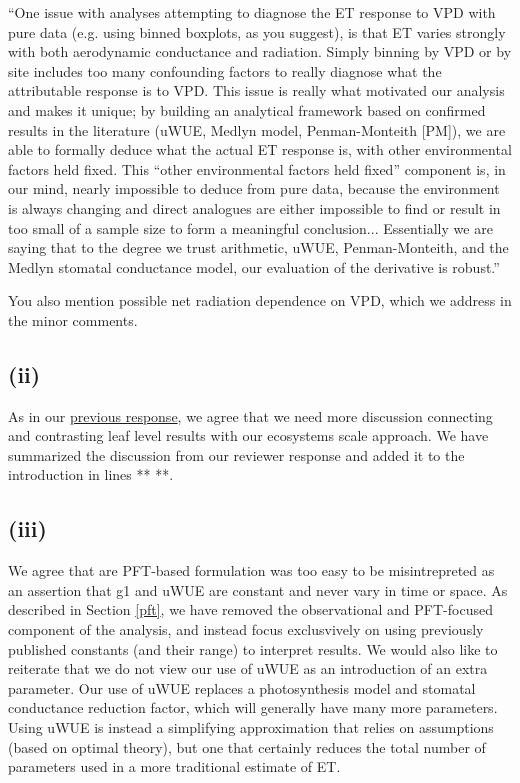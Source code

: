 \documentclass[12pt]{article}
\begin{document}
``One issue with analyses attempting to diagnose the ET response to
VPD with pure data (e.g. using binned boxplots, as you suggest), is
that ET varies strongly with both aerodynamic conductance and
radiation. Simply binning by VPD or by site includes too many
confounding factors to really diagnose what the attributable response
is to VPD. This issue is really what motivated our analysis and makes
it unique; by building an analytical framework based on confirmed
results in the literature (uWUE, Medlyn model, Penman-Monteith [PM]),
we are able to formally deduce what the actual ET response is, with
other environmental factors held fixed. This ``other environmental
factors held fixed'' component is, in our mind, nearly impossible to
deduce from pure data, because the environment is always changing and
direct analogues are either impossible to find or result in too small
of a sample size to form a meaningful conclusion... Essentially we are
saying that to the degree we trust arithmetic, uWUE, Penman-Monteith,
and the Medlyn stomatal conductance model, our evaluation of the
derivative is robust.''

You also mention possible net radiation dependence on VPD, which we
address in the minor comments.

\subsection{(ii)}
\label{leaf}
As in our
\href{https://www.hydrol-earth-syst-sci-discuss.net/hess-2018-553/hess-2018-553-AC2-supplement.pdf}{previous
  response}, we agree that we need more discussion connecting and
contrasting leaf level results with our ecosystems scale approach. We
have summarized the discussion from our reviewer response and added it
to the introduction in lines ** **.

\subsection{(iii)}

We agree that are PFT-based formulation was too easy to be
misintrepreted as an assertion that g1 and uWUE are constant and never
vary in time or space. As described in Section \ref{pft}, we have
removed the observational and PFT-focused component of the analysis,
and instead focus exclusvively on using previously published constants
(and their range) to interpret results. We would also like to
reiterate that we do not view our use of uWUE as an introduction of an
extra parameter. Our use of uWUE replaces a photosynthesis model and
stomatal conductance reduction factor, which will generally have many
more parameters. Using uWUE is instead a simplifying approximation
that relies on assumptions (based on optimal theory), but one that
certainly reduces the total number of parameters used in a more
traditional estimate of ET.
\end{document}
